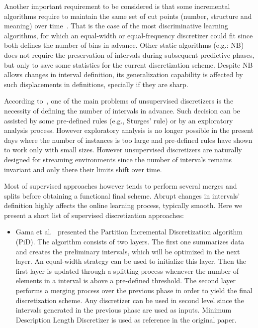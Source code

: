 \documentclass[preprint,12pt]{elsarticle}
\begin{document}
\begin{itemize}
Another important requirement to be considered is that some incremental algorithms require to maintain the same set of cut points (number, structure and meaning) over time~\cite{webb14}. That is the case of the most discriminative learning algorithms, for which an equal-width or equal-frequency discretizer could fit since both defines the number of bins in advance. Other static algorithms (e.g.: NB) does not require the preservation of intervals during subsequent predictive phases, but only to save some statistics for the current discretization scheme. Despite NB allows changes in interval definition, its generalization capability is affected by such displacements in definitions, specially if they are sharp.

According to~\cite{gama06}, one of the main problems of unsupervised discretizers is the necessity of defining the number of intervals in advance. Such decision can be assisted by some pre-defined rules (e.g., Sturges' rule) or by an exploratory analysis process. However exploratory analysis is no longer possible in the present days where the number of instances is too large and pre-defined rules have shown to work only with small sizes. However unsupervised discretizers are naturally designed for streaming environments since the number of intervals remains invariant and only there their limits shift over time. 

Most of supervised approaches however tends to perform several merges and splits before obtaining a functional final scheme. Abrupt changes in intervals' definition highly affects the online learning process, typically smooth. Here we present a short list of supervised discretization approaches:

\begin{itemize}
	\item Gama et al.~\cite{gama06} presented the Partition Incremental Discretization algorithm (PiD). The algorithm consists of two layers. The first one summarizes data and creates the preliminary intervals, which will be optimized in the next layer. An equal-width strategy can be used to initialize this layer. Then the first layer is updated through a splitting process whenever the number of elements in a interval is above a pre-defined threshold. The second layer performs a merging process over the previous phase in order to yield the final discretization scheme. Any discretizer can be used in second level since the intervals generated in the previous phase are used as inputs. Minimum Description Length Discretizer is used as reference in the original paper. 
	

\end{itemize}
\end{itemize}
\end{document}
